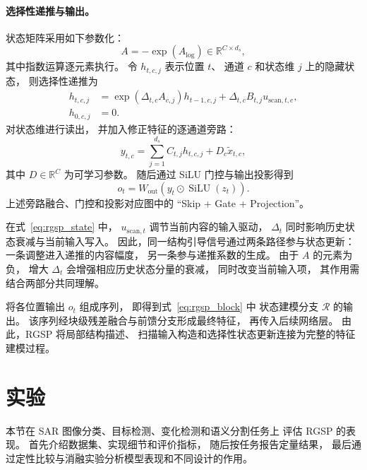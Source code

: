 \documentclass[journal]{IEEEtran}
\begin{document}
\paragraph{选择性递推与输出。}
状态矩阵采用如下参数化：
\begin{equation}
A=-\exp(A_{\log})
\in\mathbb{R}^{C\times d_s},
\label{eq:state_matrix}
\end{equation}
其中指数运算逐元素执行。
令 $h_{t,c,j}$ 表示位置 $t$、
通道 $c$ 和状态维 $j$ 上的隐藏状态，
则选择性递推为
\begin{equation}
\begin{aligned}
h_{t,c,j}&=\exp\left(\Delta_{t,c}A_{c,j}\right)h_{t-1,c,j}
+\Delta_{t,c}B_{t,j}u_{\mathrm{scan},t,c},\\
h_{0,c,j}&=0.
\end{aligned}
\label{eq:rgsp_state}
\end{equation}
对状态维进行读出，
并加入修正特征的逐通道旁路：
\begin{equation}
y_{t,c}
=
\sum_{j=1}^{d_s}C_{t,j}h_{t,c,j}
+
D_c\tilde{x}_{t,c},
\label{eq:ssm_readout}
\end{equation}
其中 $D\in\mathbb{R}^{C}$ 为可学习参数。
随后通过 SiLU 门控与输出投影得到
\begin{equation}
o_t
=
W_{\mathrm{out}}
\left(
y_t\odot\operatorname{SiLU}(z_t)
\right).
\label{eq:rgsp_output}
\end{equation}
上述旁路融合、门控和投影对应图中的
``Skip + Gate + Projection''。

在式~\eqref{eq:rgsp_state} 中，
$u_{\mathrm{scan},t}$ 调节当前内容的输入驱动，
$\Delta_t$ 同时影响历史状态衰减与当前输入写入。
因此，同一结构引导信号通过两条路径参与状态更新：
一条调整进入递推的内容幅度，
另一条参与递推系数的生成。
由于 $A$ 的元素为负，
增大 $\Delta_t$ 会增强相应历史状态分量的衰减，
同时改变当前输入项，
其作用需结合两部分共同理解。

将各位置输出 $o_t$ 组成序列，
即得到式~\eqref{eq:rgsp_block} 中
状态建模分支 $\mathcal{R}$ 的输出。
该序列经块级残差融合与前馈分支形成最终特征，
再传入后续网络层。
由此，RGSP 将局部结构描述、
扫描输入构造和选择性状态更新连接为完整的特征建模过程。
\section{实验}
\label{sec:experiments}

本节在 SAR 图像分类、目标检测、变化检测和语义分割任务上
评估 RGSP 的表现。
首先介绍数据集、实现细节和评价指标，
随后按任务报告定量结果，
最后通过定性比较与消融实验分析模型表现和不同设计的作用。
\end{document}
